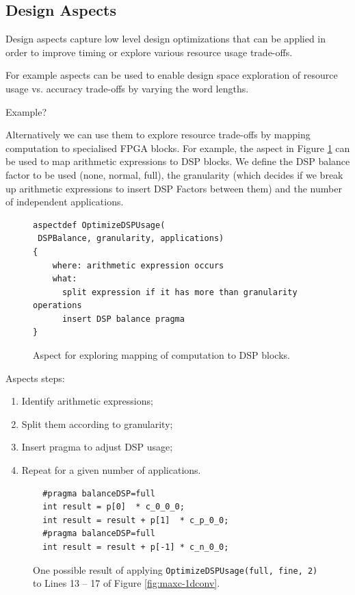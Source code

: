 \subsection{Design Aspects}

Design aspects capture low level design optimizations that can be
applied in order to improve timing or explore various resource usage
trade-offs.

For example aspects can be used to enable design space exploration of
resource usage vs. accuracy trade-offs by varying the word lengths.

\TODO Example?

Alternatively we can use them to explore resource trade-offs by
mapping computation to specialised FPGA blocks. For example, the
aspect in Figure \ref{fig:aspect-DSP} can be used to map arithmetic
expressions to DSP blocks. We define the DSP balance factor to be used
(none, normal, full), the granularity (which decides if we break up
arithmetic expressions to insert DSP Factors between them) and the
number of independent applications.

\lstset{style=aspectp}
\begin{figure}[!h]
\centering
\begin{lstlisting}
aspectdef OptimizeDSPUsage(
 DSPBalance, granularity, applications)
{
    where: arithmetic expression occurs
    what:
      split expression if it has more than granularity operations
      insert DSP balance pragma
}
\end{lstlisting}
\caption{Aspect for exploring mapping of computation to DSP blocks.}
\label{fig:aspect-DSP}
\end{figure}

Aspects steps:

\begin{enumerate}
\item Identify arithmetic expressions;
\item Split them according to granularity;
\item Insert pragma to adjust DSP usage;
\item Repeat for a given number of applications.
\end{enumerate}

\newsavebox{\secondlisting}
\begin{lrbox}{\secondlisting}%

\end{lrbox}

\begin{figure}
\begin{lstlisting}
  #pragma balanceDSP=full
  int result = p[0]  * c_0_0_0;
  int result = result + p[1]  * c_p_0_0;
  #pragma balanceDSP=full
  int result = result + p[-1] * c_n_0_0;
\end{lstlisting}
\caption{One possible result of applying
  \texttt{OptimizeDSPUsage(full, fine, 2)} to Lines 13 -- 17 of Figure
  \ref{fig:maxc-1dconv}.}
\label{fig:maxc-1dconv-aspect}
\end{figure}

